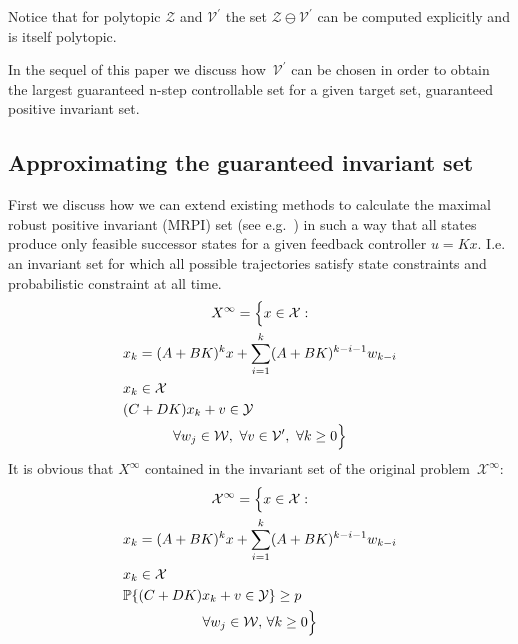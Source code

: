\documentclass{ifacconf}
\providecommand{\W}{\mathcal W}
\providecommand{\V}{\mathcal V}
\providecommand{\X}{\mathcal X}
\providecommand{\Y}{\mathcal Y}
\providecommand{\Z}{\mathcal Z}
\providecommand{\PP}{\mathbb P}
\begin{document}
Notice that for polytopic $\Z$ and $\V^\prime$ the set $\Z\ominus\V^\prime$ can be computed explicitly and is itself polytopic.


In the sequel of this paper we discuss how~$\V^\prime$ can be chosen in order to obtain the largest guaranteed n-step controllable set for a given target set, guaranteed positive invariant set.


\subsection{Approximating the guaranteed invariant set}\label{ssec:approximating:MRPI}
%
First we discuss how we can extend existing methods to calculate the maximal robust positive invariant (MRPI) set (see e.g.~\cite{blanchini:2007}) in such a way that all states produce only feasible successor states for a given feedback controller $u = Kx$.
%
I.e. an invariant set for which all possible trajectories satisfy state constraints and probabilistic constraint at all time.
%
\begin{multline}\label{eq:alternative:MRPI:set}
	X^\infty = \Bigl\{x\in\X: \\
\begin{aligned} 
&x_k = (A+BK)^k x + \sum_{i=1}^{k} (A+BK)^{k-i-1} w_{k-i} \\
&x_k\in\X\\
&(C+DK)x_k+v\in\Y
\end{aligned}\\
\forall w_j\in\W,\ \forall v\in \V^\prime,\ \forall k\geq 0 \Bigr\}
\end{multline}
%
It is obvious that $X^\infty$ contained in the invariant set of the original problem~$\X^\infty$:
%
\begin{multline*}
\X^\infty = \Bigl\{x\in\X: \\
\begin{aligned}
&x_k = (A+BK)^k x + \sum_{i=1}^{k} (A+BK)^{k-i-1} w_{k-i}\\
&x_k\in\X\\
&\PP\{(C+DK)x_k+v\in\Y\}\geq p 
\end{aligned}\\
\forall w_j\in\W,\, \forall k\geq 0 \Bigr\}
\end{multline*}
\end{document}

